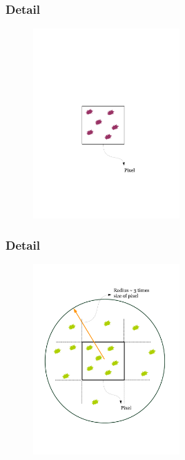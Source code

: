 \documentclass[10pt, compress]{beamer}
\begin{document}
\begin{frame}
\frametitle{Detail}
\begin{figure}
\includegraphics[width=0.5\textwidth]{pixel.jpg}
\end{figure}

\end{frame}

\begin{frame}
\frametitle{Detail}
\begin{figure}\centering
\includegraphics[width=0.5\textwidth, scale = 2.0]{pixelAndRadius.jpg}
\end{figure}

\end{frame}
\end{document}
